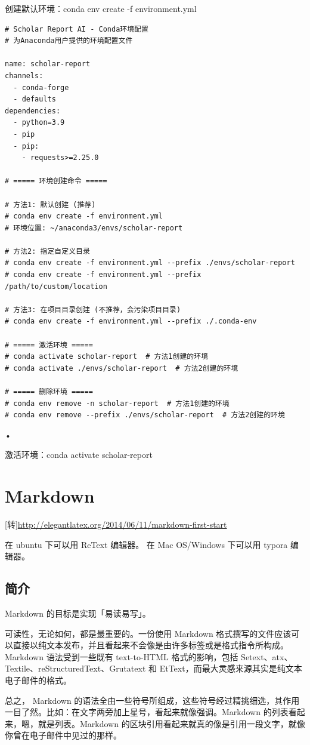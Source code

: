 创建默认环境：conda env create -f environment.yml

\begin{verbatim}
# Scholar Report AI - Conda环境配置
# 为Anaconda用户提供的环境配置文件

name: scholar-report
channels:
  - conda-forge
  - defaults
dependencies:
  - python=3.9
  - pip
  - pip:
    - requests>=2.25.0

# ===== 环境创建命令 =====

# 方法1: 默认创建 (推荐)
# conda env create -f environment.yml
# 环境位置: ~/anaconda3/envs/scholar-report

# 方法2: 指定自定义目录
# conda env create -f environment.yml --prefix ./envs/scholar-report
# conda env create -f environment.yml --prefix /path/to/custom/location

# 方法3: 在项目目录创建 (不推荐，会污染项目目录)
# conda env create -f environment.yml --prefix ./.conda-env

# ===== 激活环境 =====
# conda activate scholar-report  # 方法1创建的环境
# conda activate ./envs/scholar-report  # 方法2创建的环境

# ===== 删除环境 =====
# conda env remove -n scholar-report  # 方法1创建的环境
# conda env remove --prefix ./envs/scholar-report  # 方法2创建的环境
\end{verbatim}•


激活环境：conda activate scholar-report





\chapter{Markdown}
[转]\url{http://elegantlatex.org/2014/06/11/markdown-first-start}

在 ubuntu 下可以用 ReText 编辑器。
在 Mac OS/Windows 下可以用 typora 编辑器。

\section{简介}
Markdown 的目标是实现「易读易写」。

可读性，无论如何，都是最重要的。一份使用 Markdown 格式撰写的文件应该可以直接以纯文本发布，并且看起来不会像是由许多标签或是格式指令所构成。Markdown 语法受到一些既有 text-to-HTML 格式的影响，包括 Setext、atx、Textile、reStructuredText、Grutatext 和 EtText，而最大灵感来源其实是纯文本电子邮件的格式。

总之， Markdown 的语法全由一些符号所组成，这些符号经过精挑细选，其作用一目了然。比如：在文字两旁加上星号，看起来就像强调。Markdown 的列表看起来，嗯，就是列表。Markdown 的区块引用看起来就真的像是引用一段文字，就像你曾在电子邮件中见过的那样。


